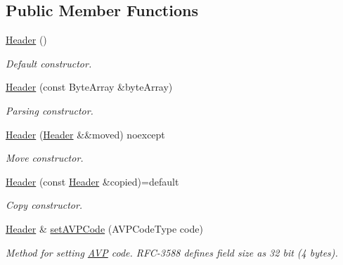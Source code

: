 \subsection*{Public Member Functions}
\begin{DoxyCompactItemize}
\item 
\mbox{\label{classDiameter_1_1AVP_1_1Header_a2b5517008e00ca03e5ed873e3c69eeb0}} 
\hyperlink{classDiameter_1_1AVP_1_1Header_a2b5517008e00ca03e5ed873e3c69eeb0}{Header} ()
\begin{DoxyCompactList}\small\item\em Default constructor. \end{DoxyCompactList}\item 
\hyperlink{classDiameter_1_1AVP_1_1Header_ac08a910e8453759d348294223bc35e2f}{Header} (const Byte\+Array \&byte\+Array)
\begin{DoxyCompactList}\small\item\em Parsing constructor. \end{DoxyCompactList}\item 
\mbox{\label{classDiameter_1_1AVP_1_1Header_a283aed1b1f1d8f76cdef476ef73e81e9}} 
\hyperlink{classDiameter_1_1AVP_1_1Header_a283aed1b1f1d8f76cdef476ef73e81e9}{Header} (\hyperlink{classDiameter_1_1AVP_1_1Header}{Header} \&\&moved) noexcept
\begin{DoxyCompactList}\small\item\em Move constructor. \end{DoxyCompactList}\item 
\hyperlink{classDiameter_1_1AVP_1_1Header_ae37e5cbd056bb99cb583f5ec7e4285d6}{Header} (const \hyperlink{classDiameter_1_1AVP_1_1Header}{Header} \&copied)=default
\begin{DoxyCompactList}\small\item\em Copy constructor. \end{DoxyCompactList}\item 
\hyperlink{classDiameter_1_1AVP_1_1Header}{Header} \& \hyperlink{classDiameter_1_1AVP_1_1Header_a74ba1debad513ac3eaebf760228ee9c0}{set\+A\+V\+P\+Code} (A\+V\+P\+Code\+Type code)
\begin{DoxyCompactList}\small\item\em Method for setting \hyperlink{classDiameter_1_1AVP}{A\+VP} code. R\+F\+C-\/3588 defines field size as 32 bit (4 bytes). \end{DoxyCompactList}\item 

\end{DoxyCompactItemize}
